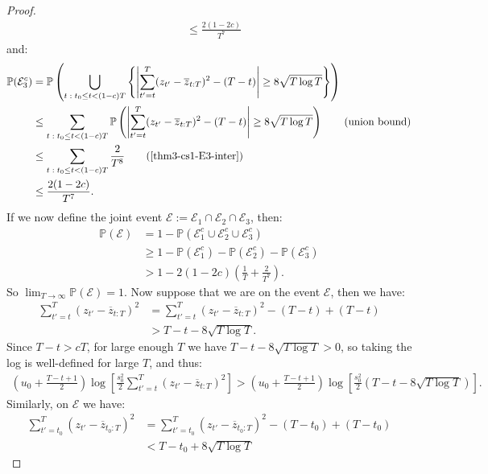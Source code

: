 \begin{proof}
\begin{align*}
    &\leq \frac{2(1-2c)}{T^7}
\end{align*}
and:
\begin{align*}
    \mathbb{P}(\mathcal{E}^c_3) &= \mathbb{P}\left(\bigcup_{t\;:\; t_0 \leq t < (1-c)T} \left\{\left|\sum_{t'=t}^T (z_{t'} - \overline{z}_{t:T})^2 - (T-t)\right| \geq 8\sqrt{T \log T}\right\}\right) \\
    &\leq \sum_{t\;:\; t_0 \leq t < (1-c)T} \mathbb{P}\left(\left|\sum_{t'=t}^T (z_{t'} - \overline{z}_{t:T})^2 - (T-t)\right| \geq 8\sqrt{T \log T}\right) \tag{union bound}\\
    &\leq \sum_{t\;:\; t_0 \leq t < (1-c)T} \frac{2}{T^8} \tag{\ref{thm3-cs1-E3-inter}}\\
    &\leq \frac{2(1-2c)}{T^7}.
\end{align*}
If we now define the joint event $\mathcal{E} := \mathcal{E}_1 \cap \mathcal{E}_2 \cap \mathcal{E}_3$, then:
\begin{align*}
    \mathbb{P}(\mathcal{E}) &= 1 - \mathbb{P}(\mathcal{E}^c_1 \cup \mathcal{E}^c_2 \cup \mathcal{E}^c_3) \\
    &\geq 1 - \mathbb{P}(\mathcal{E}^c_1 ) - \mathbb{P}(\mathcal{E}^c_2) - \mathbb{P}(\mathcal{E}^c_3)  \tag{union bound} \\
    &> 1 - 2(1-2c)\left(\frac{1}{T} + \frac{2}{T^7}\right).
\end{align*}
So $\lim_{T\to\infty} \mathbb{P}(\mathcal{E})  = 1$. Now suppose that we are on the event $\mathcal{E}$, then we have:
\begin{align*}
    \sum_{t'=t}^T (z_{t'} - \overline{z}_{t:T})^2 &= \sum_{t'=t}^T (z_{t'} - \overline{z}_{t:T})^2 - (T-t) + (T-t) \\
    &> T-t - 8 \sqrt{T \log T}. 
\end{align*}
Since $T-t > cT$, for large enough $T$ we have $T-t - 8 \sqrt{T \log T} > 0$, so taking the log is well-defined for large $T$, and thus:
\begin{align}
    \left(u_0 + \frac{T - t +1}{2}\right)\log\left[ \frac{s_0^2}{2}\sum_{t'=t}^T (z_{t'} - \overline{z}_{t:T})^2 \right]  > \left(u_0 + \frac{T - t +1}{2}\right)\log\left[ \frac{s_0^2}{2} \left(T - t - 8\sqrt{T \log T}\right)\right]. \label{eq:thm3-cs1-bd2}
\end{align}
Similarly, on $\mathcal{E}$ we have:
\begin{align*}
    \sum_{t'=t_0}^T (z_{t'} - \overline{z}_{t_0:T})^2 &= \sum_{t'=t_0}^T (z_{t'} - \overline{z}_{t_0:T})^2 - (T-t_0) + (T-t_0) \\
    &< T-t_0 + 8 \sqrt{T \log T}  

\end{align*}
\end{proof}
